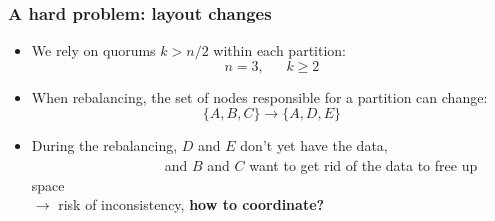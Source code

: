 \documentclass[aspectratio=169]{beamer}
\begin{document}
\begin{frame}
	\frametitle{A hard problem: layout changes}
	\begin{itemize}
		\item We rely on quorums $k > n/2$ within each partition:\\
			$$n=3,~~~~~~~k\ge 2$$
		\item<2-> When rebalancing, the set of nodes responsible for a partition can change:\\
			$$\{A, B, C\} \to \{A, D, E\}$$
			\vspace{.01em}
		\item<3-> During the rebalancing, $D$ and $E$ don't yet have the data,\\
			~~~~~~~~~~~~~~~~~~~and $B$ and $C$ want to get rid of the data to free up space\\
			\vspace{1.2em}
			$\to$ risk of inconsistency, \textbf{how to coordinate?}
	\end{itemize}
\end{frame}
\end{document}
